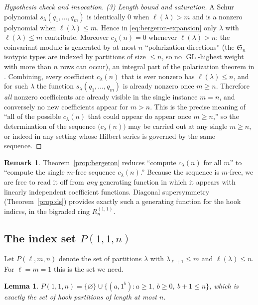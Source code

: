 \documentclass[11pt]{amsart}
\newtheorem{lemma}[theorem]{Lemma}
\theoremstyle{definition}
\newtheorem{remark}[theorem]{Remark}
\DeclareMathOperator{\GL}{GL}
\begin{document}
\begin{proof}[Hypothesis check and invocation]
\smallskip\noindent\emph{(3) Length bound and saturation.} A Schur polynomial
$s_\lambda(q_1,\dots,q_m)$ is identically $0$ when $\ell(\lambda)>m$ and is a
nonzero polynomial when $\ell(\lambda)\le m$. Hence in \eqref{eq:bergeron-expansion}
only $\lambda$ with $\ell(\lambda)\le m$ contribute. Moreover $c_\lambda(n)=0$
whenever $\ell(\lambda)>n$: the coinvariant module is generated by at most $n$
``polarization directions'' (the $\mathfrak{S}_n$-isotypic types are indexed by
partitions of size $\le n$, so no $\GL$-highest weight with more than $n$ rows can
occur), an integral part of the polarization theorem in \cite{Bergeron2020}.
Combining, every coefficient $c_\lambda(n)$ that is ever nonzero has
$\ell(\lambda)\le n$, and for such $\lambda$ the function $s_\lambda(q_1,\dots,q_m)$
is already nonzero once $m\ge n$. Therefore \emph{all} nonzero coefficients are
already visible in the single instance $m=n$, and conversely no new coefficients
appear for $m>n$. This is the precise meaning of ``all of the possible
$c_\lambda(n)$ that could appear do appear once $m\ge n$,'' so the determination of
the sequence $\big(c_\lambda(n)\big)$ may be carried out at any single $m\ge n$, or
indeed in any setting whose Hilbert series is governed by the same sequence.
\end{proof}

\begin{remark}\label{rem:saturation}
Theorem~\ref{prop:bergeron} reduces ``compute $c_\lambda(n)$ for all $m$'' to
``compute the single $m$-free sequence $c_\lambda(n)$.'' Because the sequence is
$m$-free, we are free to read it off from \emph{any} generating function in which
it appears with linearly independent coefficient functions. Diagonal supersymmetry
(Theorem~\ref{prop:ds}) provides exactly such a generating function for the hook
indices, in the bigraded ring $R_n^{(1,1)}$.
\end{remark}

\subsection{The index set $P(1,1,n)$}
Let $P(\ell,m,n)$ denote the set of partitions $\lambda$ with $\lambda_{\ell+1}\le m$
and $\ell(\lambda)\le n$. For $\ell=m=1$ this is the set we need.

\begin{lemma}\label{lem:P11hooks}
$P(1,1,n)=\{\varnothing\}\cup\{(a,1^b): a\ge1,\ b\ge0,\ b+1\le n\}$, which is
exactly the set of hook partitions of length at most $n$.
\end{lemma}
\end{document}
